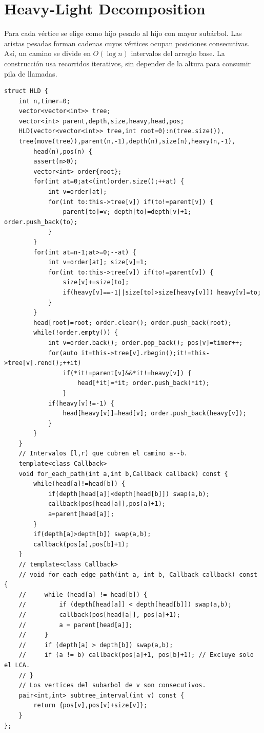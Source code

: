 \section{Heavy-Light Decomposition}

Para cada vértice se elige como hijo pesado al hijo con mayor subárbol. Las
aristas pesadas forman cadenas cuyos vértices ocupan posiciones consecutivas.
Así, un camino se divide en $O(\log n)$ intervalos del arreglo base.
La construcción usa recorridos iterativos, sin depender de la altura para
consumir pila de llamadas.


\begin{lstlisting}[style=cpp]
struct HLD {
    int n,timer=0;
    vector<vector<int>> tree;
    vector<int> parent,depth,size,heavy,head,pos;
    HLD(vector<vector<int>> tree,int root=0):n(tree.size()),
    tree(move(tree)),parent(n,-1),depth(n),size(n),heavy(n,-1),
        head(n),pos(n) {
        assert(n>0);
        vector<int> order{root};
        for(int at=0;at<(int)order.size();++at) {
            int v=order[at];
            for(int to:this->tree[v]) if(to!=parent[v]) {
                parent[to]=v; depth[to]=depth[v]+1; order.push_back(to);
            }
        }
        for(int at=n-1;at>=0;--at) {
            int v=order[at]; size[v]=1;
            for(int to:this->tree[v]) if(to!=parent[v]) {
                size[v]+=size[to];
                if(heavy[v]==-1||size[to]>size[heavy[v]]) heavy[v]=to;
            }
        }
        head[root]=root; order.clear(); order.push_back(root);
        while(!order.empty()) {
            int v=order.back(); order.pop_back(); pos[v]=timer++;
            for(auto it=this->tree[v].rbegin();it!=this->tree[v].rend();++it)
                if(*it!=parent[v]&&*it!=heavy[v]) {
                    head[*it]=*it; order.push_back(*it);
                }
            if(heavy[v]!=-1) {
                head[heavy[v]]=head[v]; order.push_back(heavy[v]);
            }
        }
    }
    // Intervalos [l,r) que cubren el camino a--b.
    template<class Callback>
    void for_each_path(int a,int b,Callback callback) const {
        while(head[a]!=head[b]) {
            if(depth[head[a]]<depth[head[b]]) swap(a,b);
            callback(pos[head[a]],pos[a]+1);
            a=parent[head[a]];
        }
        if(depth[a]>depth[b]) swap(a,b);
        callback(pos[a],pos[b]+1);
    }
    // template<class Callback>
    // void for_each_edge_path(int a, int b, Callback callback) const {
    //     while (head[a] != head[b]) {
    //         if (depth[head[a]] < depth[head[b]]) swap(a,b);
    //         callback(pos[head[a]], pos[a]+1);
    //         a = parent[head[a]];
    //     }
    //     if (depth[a] > depth[b]) swap(a,b);
    //     if (a != b) callback(pos[a]+1, pos[b]+1); // Excluye solo el LCA.
    // }
    // Los vertices del subarbol de v son consecutivos.
    pair<int,int> subtree_interval(int v) const {
        return {pos[v],pos[v]+size[v]};
    }
};
\end{lstlisting}

